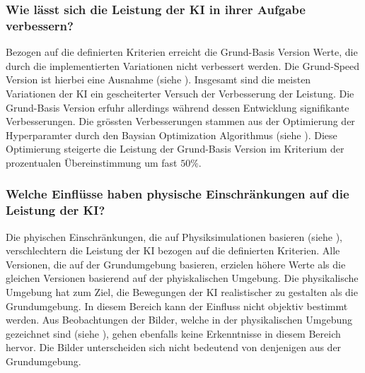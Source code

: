 \subsubsection*{Wie lässt sich die Leistung der KI in ihrer Aufgabe verbessern?}\label{subsub:d_frage_unter_3} 
Bezogen auf die definierten Kriterien erreicht die Grund-Basis Version Werte,
die durch die implementierten Variationen nicht verbessert werden. Die
Grund-Speed Version ist hierbei eine Ausnahme (siehe ).
Insgesamt sind die meisten Variationen der KI ein gescheiterter Versuch der
Verbesserung der Leistung. Die Grund-Basis Version erfuhr allerdings während
dessen Entwicklung signifikante Verbesserungen. Die grössten Verbesserungen
stammen aus der Optimierung der Hyperparamter durch den Baysian Optimization
Algorithmus (siehe ). Diese Optimierung steigerte
die Leistung der Grund-Basis Version im Kriterium der prozentualen
Übereinstimmung um fast $50\%$.

\subsubsection*{Welche Einflüsse haben physische Einschränkungen auf die
Leistung der KI?}\label{subsub:d_frage_unter_4} Die phyischen Einschränkungen,
die auf Physiksimulationen basieren (siehe ),
verschlechtern die Leistung der KI bezogen auf die definierten Kriterien. Alle
Versionen, die auf der Grundumgebung basieren, erzielen höhere Werte als die
gleichen Versionen basierend auf der phyiskalischen Umgebung. Die physikalische
Umgebung hat zum Ziel, die Bewegungen der KI realistischer zu gestalten als die
Grundumgebung. In diesem Bereich kann der Einfluss nicht objektiv bestimmt
werden. Aus Beobachtungen der Bilder, welche in der physikalischen Umgebung
gezeichnet sind (siehe ), gehen ebenfalls keine
Erkenntnisse in diesem Bereich hervor. Die Bilder unterscheiden sich nicht
bedeutend von denjenigen aus der Grundumgebung.

